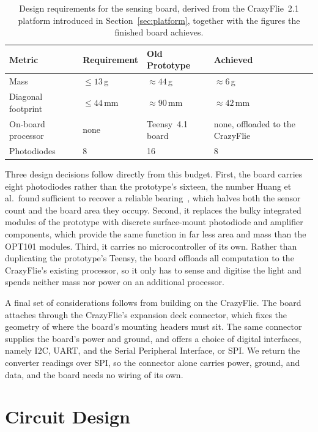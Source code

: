 \begin{table}[h]
    \centering
    \caption{Design requirements for the sensing board, derived from the CrazyFlie~2.1 platform introduced in Section~\ref{sec:platform}, together with the figures the finished board achieves.}
    \label{tab:requirements}
    \begin{tabular}{llll}
        \hline
        Metric & Requirement & Old Prototype & Achieved \\
        \hline
        Mass               & $\leq 13$\,g      & $\approx 44$\,g & $\approx 6$\,g \\
        Diagonal footprint & $\leq 44$\,mm & $\approx 90$\,mm & $\approx 42$\,mm \\
        On-board processor & none          & Teensy~4.1 board & none, offloaded to the CrazyFlie \\
        Photodiodes        & 8             & 16       & 8 \\
        \hline
    \end{tabular}
\end{table}

Three design decisions follow directly from this budget. First, the board carries eight photodiodes rather than the prototype's sixteen, the number Huang et al.\ found sufficient to recover a reliable bearing~\cite{huang2026lta}, which halves both the sensor count and the board area they occupy. Second, it replaces the bulky integrated modules of the prototype with discrete surface-mount photodiode and amplifier components, which provide the same function in far less area and mass than the OPT101 modules. Third, it carries no microcontroller of its own. Rather than duplicating the prototype's Teensy, the board offloads all computation to the CrazyFlie's existing processor, so it only has to sense and digitise the light and spends neither mass nor power on an additional processor.

A final set of considerations follows from building on the CrazyFlie. The board attaches through the CrazyFlie's expansion deck connector, which fixes the geometry of where the board's mounting headers must sit. The same connector supplies the board's power and ground, and offers a choice of digital interfaces, namely I2C, UART, and the Serial Peripheral Interface, or SPI. We return the converter readings over SPI, so the connector alone carries power, ground, and data, and the board needs no wiring of its own.

\section{Circuit Design}

